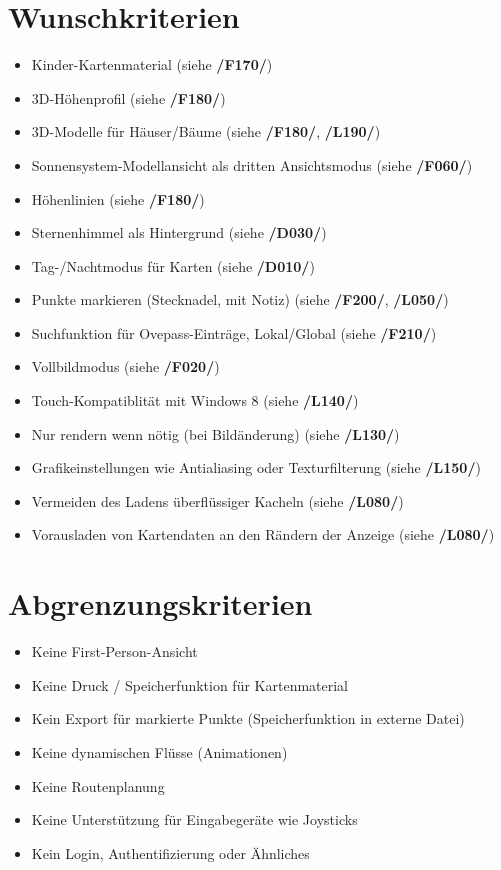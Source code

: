 \documentclass[10pt]{scrreprt}
\begin{document}
\section{Wunschkriterien}
\begin{itemize}
\item Kinder-Kartenmaterial (siehe \textbf{/F170/})
\item 3D-Höhenprofil (siehe \textbf{/F180/})
\item 3D-Modelle für Häuser/Bäume (siehe \textbf{/F180/}, \textbf{/L190/})
\item Sonnensystem-Modellansicht als dritten Ansichtsmodus (siehe \textbf{/F060/})
\item Höhenlinien (siehe \textbf{/F180/})
\item Sternenhimmel als Hintergrund (siehe \textbf{/D030/})
\item Tag-/Nachtmodus für Karten (siehe \textbf{/D010/})
\item Punkte markieren (Stecknadel, mit Notiz) (siehe \textbf{/F200/}, \textbf{/L050/})
\item Suchfunktion für Ovepass-Einträge, Lokal/Global (siehe \textbf{/F210/})
\item Vollbildmodus (siehe \textbf{/F020/})
\item Touch-Kompatiblität mit Windows 8 (siehe \textbf{/L140/})
\item Nur rendern wenn nötig (bei Bildänderung) (siehe \textbf{/L130/})
\item Grafikeinstellungen wie Antialiasing oder Texturfilterung (siehe \textbf{/L150/})
\item Vermeiden des Ladens überflüssiger Kacheln (siehe \textbf{/L080/})
\item Vorausladen von Kartendaten an den Rändern der Anzeige (siehe \textbf{/L080/})
\end{itemize}
\section{Abgrenzungskriterien}
\begin{itemize}
\item Keine First-Person-Ansicht
\item Keine Druck / Speicherfunktion für Kartenmaterial
\item Kein Export für markierte Punkte (Speicherfunktion in externe Datei)
\item Keine dynamischen Flüsse (Animationen)
\item Keine Routenplanung
\item Keine Unterstützung für Eingabegeräte wie Joysticks
\item Kein Login, Authentifizierung oder Ähnliches
\end{itemize}
\end{document}
